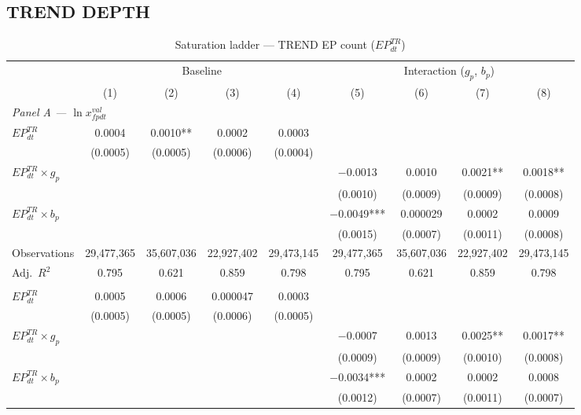 \documentclass{article}
\begin{document}
\subsection{TREND DEPTH}

\begin{table}[htbp]
\centering
\footnotesize
\caption{Saturation ladder --- TREND EP count ($EP^{TR}_{dt}$)}
\label{tab:ladder_trend}
\begin{threeparttable}
\begin{tabular}{lcccccccc}
\toprule
 & \multicolumn{4}{c}{Baseline} & \multicolumn{4}{c}{Interaction ($g_p$, $b_p$)} \\
\cmidrule(lr){2-5}\cmidrule(lr){6-9}
 & (1) & (2) & (3) & (4) & (5) & (6) & (7) & (8) \\
\midrule
\multicolumn{9}{l}{\textit{Panel A --- $\ln x^{val}_{fpdt}$}} \\[3pt]
\quad $EP^{TR}_{dt}$ & 0.0004 & 0.0010** & 0.0002 & 0.0003 &  &  &  &  \\
 & (0.0005) & (0.0005) & (0.0006) & (0.0004) &  &  &  &  \\
\quad $EP^{TR}_{dt} \times g_p$ &  &  &  &  & $-$0.0013 & 0.0010 & 0.0021** & 0.0018** \\
 &  &  &  &  & (0.0010) & (0.0009) & (0.0009) & (0.0008) \\
\quad $EP^{TR}_{dt} \times b_p$ &  &  &  &  & $-$0.0049*** & 0.000029 & 0.0002 & 0.0009 \\
 &  &  &  &  & (0.0015) & (0.0007) & (0.0011) & (0.0008) \\[3pt]
Observations & 29,477,365 & 35,607,036 & 22,927,402 & 29,473,145 & 29,477,365 & 35,607,036 & 22,927,402 & 29,473,145 \\
Adj.\ $R^2$ & 0.795 & 0.621 & 0.859 & 0.798 & 0.795 & 0.621 & 0.859 & 0.798 \\
\addlinespace[6pt]
\midrule
\multicolumn{9}{l}{\textit{Panel B --- $\ln x^{qua}_{fpdt}$}} \\[3pt]
\quad $EP^{TR}_{dt}$ & 0.0005 & 0.0006 & 0.000047 & 0.0003 &  &  &  &  \\
 & (0.0005) & (0.0005) & (0.0006) & (0.0005) &  &  &  &  \\
\quad $EP^{TR}_{dt} \times g_p$ &  &  &  &  & $-$0.0007 & 0.0013 & 0.0025** & 0.0017** \\
 &  &  &  &  & (0.0009) & (0.0009) & (0.0010) & (0.0008) \\
\quad $EP^{TR}_{dt} \times b_p$ &  &  &  &  & $-$0.0034*** & 0.0002 & 0.0002 & 0.0008 \\
 &  &  &  &  & (0.0012) & (0.0007) & (0.0011) & (0.0007) \\[3pt]

\end{tabular}
\end{threeparttable}
\end{table}
\end{document}
